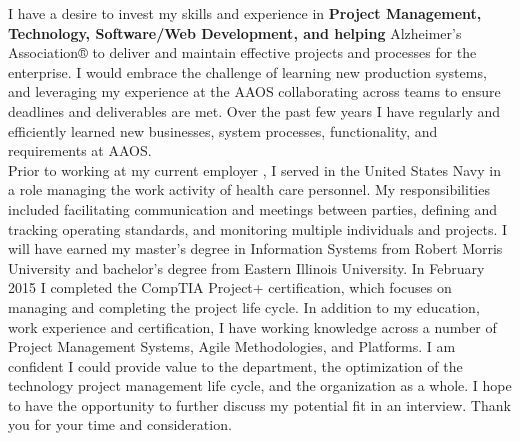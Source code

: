 \documentclass[9pt, a4paper]{awesome-cv}
\begin{document}
\begin{cvletter}
I have a desire to invest my skills and experience in \textbf{Project Management, Technology, Software/Web Development, and helping}
Alzheimer's Association®
to deliver and maintain effective projects and processes for the enterprise. I would embrace the challenge of learning new production systems, and leveraging my experience at the AAOS collaborating across teams to ensure deadlines and deliverables are met. Over the past few years I have regularly and efficiently learned new businesses, system processes, functionality, and requirements at AAOS.\\

Prior to working at my current employer , I served in the  United States Navy in a role managing the work activity of health care personnel. My responsibilities included facilitating communication and meetings between parties, defining and tracking operating standards, and monitoring multiple individuals and projects. I will have earned my master’s degree in Information Systems from Robert Morris University and bachelor’s degree from Eastern Illinois University. In February 2015 I completed the CompTIA Project+ certification, which focuses on managing and completing the project life cycle. In addition to my education, work experience and certification, I have working knowledge across a number of Project Management Systems, Agile Methodologies, and Platforms. I am confident I could provide value to the department, the optimization of the technology project management life cycle, and the organization as a whole. I hope to have the opportunity to further discuss my potential fit in an interview. Thank you for your time and consideration.

\end{cvletter}

\makeletterclosing
\end{document}

